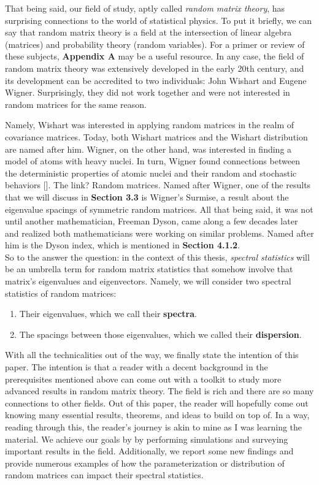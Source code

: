 That being said, our field of study, aptly called \textit{random matrix theory}, has surprising connections to the world of statistical physics.
To put it briefly, we can say that random matrix theory is a field at the intersection of linear algebra (matrices) and probability theory (random variables).
For a primer or review of these subjects, \textbf{Appendix A} may be a useful resource.
In any case, the field of random matrix theory was extensively developed in the early 20th century, and its development can be accredited to two individuals: John Wishart and Eugene Wigner.
Surprisingly, they did not work together and were not interested in random matrices for the same reason.

Namely, Wishart was interested in applying random matrices in the realm of covariance matrices. Today, both Wishart matrices and the Wishart distribution are named after him.
Wigner, on the other hand, was interested in finding a model of atoms with heavy nuclei.
In turn, Wigner found connections between the deterministic properties of atomic nuclei and their random and stochastic behaviors [\cite{wigneratom}].
The link? Random matrices.
Named after Wigner, one of the results that we will discuss in \textbf{Section 3.3} is Wigner's Surmise, a result about the eigenvalue spacings of symmetric random matrices.
All that being said, it was not until another mathematician, Freeman Dyson, came along a few decades later and realized both mathematicians were working on similar problems.
Named after him is the Dyson index, which is mentioned in \textbf{Section 4.1.2}. \\

So to the answer the question: in the context of this thesis, \textit{spectral statistics} will be an umbrella term for random matrix statistics that somehow involve that matrix's eigenvalues and eigenvectors.
Namely, we will consider two spectral statistics of random matrices:
  \begin{enumerate}
    \item Their eigenvalues, which we call their \textbf{spectra}.
    \item The spacings between those eigenvalues, which we called their \textbf{dispersion}.\\
  \end{enumerate}

With all the technicalities out of the way, we finally state the intention of this paper.
The intention is that a reader with a decent background in the prerequisites mentioned above can come out with a toolkit to study more advanced results in random matrix theory.
The field is rich and there are so many connections to other fields.
Out of this paper, the reader will hopefully come out knowing many essential results, theorems, and ideas to build on top of.
In a way, reading through this, the reader's journey is akin to mine as I was learning the material.
We achieve our goals by by performing simulations and surveying important results in the field.
Additionally, we report some new findings and provide numerous examples of how the parameterization or distribution of random matrices can impact their spectral statistics. \\

